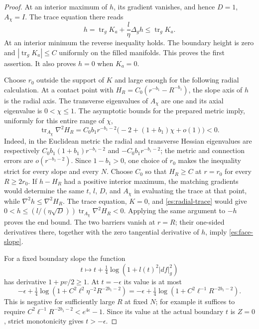 \begin{proof}
At an interior maximum of $h$, its gradient vanishes, and hence
$D=1$, $A_\chi=I$.  The trace equation there reads
\[
 h=\operatorname{tr}_gK_a+\frac l\eta\Delta_g h
       \le\operatorname{tr}_gK_a.
\]
At an interior minimum the reverse inequality holds.  The boundary
height is zero and $|\operatorname{tr}_gK_a|\le C$ uniformly on the
filled manifolds.  This proves the first assertion.  It also proves
$h=0$ when $K_a=0$.

Choose $r_0$ outside the support of $K$ and large enough for the
following radial calculation.  At a contact point with
$H_R=C_0(r^{-b_1}-R^{-b_1})$, the slope axis of $h$ is the radial axis.
The transverse eigenvalues of $A_\chi$ are one and its axial eigenvalue
is $0<\chi\le1$.  The asymptotic bounds for the prepared metric imply,
uniformly for this entire range of $\chi$,
\begin{equation}\label{es:radial-trace}
 \operatorname{tr}_{A_\chi}\nabla^2 H_R
 =C_0 b_1 r^{-b_1-2}
       \bigl(-2+(1+b_1)\chi+o(1)\bigr)<0.
\end{equation}
Indeed, in the Euclidean metric the radial and transverse Hessian
eigenvalues are respectively
$C_0b_1(1+b_1)r^{-b_1-2}$ and
$-C_0b_1r^{-b_1-2}$; the metric and connection errors are
$o(r^{-b_1-2})$.  Since $1-b_1>0$, one choice of $r_0$ makes the
inequality strict for every slope and every $N$.
Choose $C_0$ so that $H_R\ge C$ at $r=r_0$ for every $R\ge2r_0$.
If $h-H_R$ had a positive interior maximum, the matching gradients
would determine the same $t$, $l$, $D$, and $A_\chi$ in evaluating the
trace at that point, while $\nabla^2h\le\nabla^2H_R$.
The trace equation, $K=0$, and \eqref{es:radial-trace} would give
$0<h\le(l/(\eta\sqrt D))
\operatorname{tr}_{A_\chi}\nabla^2H_R<0$.
Applying the same argument to $-h$ proves the end bound.
The two barriers vanish at $r=R$; their one-sided derivatives there,
together with the zero tangential derivative of $h$, imply
\eqref{es:face-slope}.

For a fixed boundary slope the function
\[
 t\longmapsto t+\tfrac14\log(1+l(t)^2|df|_g^2)
\]
has derivative $1+pv/2\ge1$.  At $t=-\epsilon$ its value is at most
\[
 -\epsilon+\tfrac14\log
       (1+C^2\ell^2\eta^{-2}R^{-2b_1-2})
 =-\epsilon+\tfrac14\log
       (1+C^2\ell^{-1}R^{-2b_1-2}).
\]
This is negative for sufficiently large $R$ at fixed $N$; for example
it suffices to require
$C^2\ell^{-1}R^{-2b_1-2}<e^{4\epsilon}-1$.
Since its value at the actual boundary $t$ is $Z=0$, strict
monotonicity gives $t>-\epsilon$.
\end{proof}

